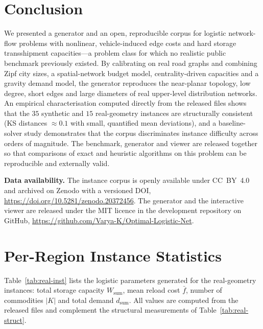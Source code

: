 \documentclass[runningheads]{llncs}
\begin{document}
\section{Conclusion}
\label{sec:conclusion}

We presented a generator and an open, reproducible corpus for logistic
network-flow problems with nonlinear, vehicle-induced edge costs and hard storage
transshipment capacities---a problem class for which no realistic public
benchmark previously existed. By calibrating on real road graphs and combining
Zipf city sizes, a spatial-network budget model, centrality-driven capacities and
a gravity demand model, the generator reproduces the near-planar topology, low
degree, short edges and large diameters of real upper-level distribution
networks. An empirical characterisation computed directly from the released
files shows that the $35$ synthetic and $15$ real-geometry instances are
structurally consistent (KS distances $\approx0.1$ with small, quantified mean
deviations), and a baseline-solver study demonstrates that the corpus
discriminates instance difficulty across orders of magnitude. The benchmark,
generator and viewer are released together so that comparisons of exact and
heuristic algorithms on this problem can be reproducible and externally valid.

\bigskip
\noindent\textbf{Data availability.} The instance corpus is openly available
under CC~BY~4.0 and archived on Zenodo with a versioned DOI,
\url{https://doi.org/10.5281/zenodo.20372456}. The generator and the interactive
viewer are released under the MIT licence in the development repository on
GitHub, \url{https://github.com/Varya-K/Optimal-Logistic-Net}.

\appendix
\section{Per-Region Instance Statistics}
\label{app:real}
Table~\ref{tab:real-inst} lists the logistic parameters generated for the
real-geometry instances: total storage capacity $W_{\text{sum}}$, mean reload
cost $\bar f$, number of commodities $|K|$ and total demand $d_{\text{sum}}$.
All values are computed from the released files and complement the structural
measurements of Table~\ref{tab:real-struct}.
\end{document}
